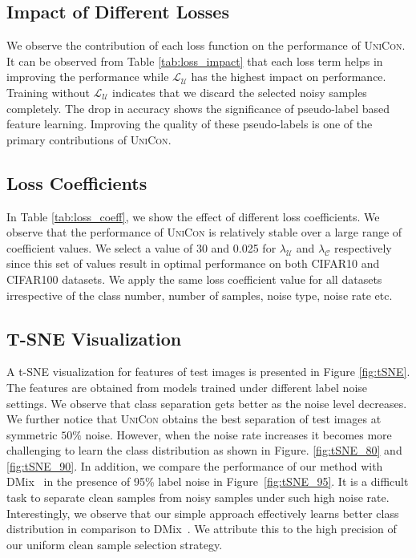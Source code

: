 \documentclass[10pt,twocolumn,letterpaper]{article}
\begin{document}
\subsection{Impact of Different Losses}
We observe the contribution of each loss function on the performance of \textsc{UniCon}. It can be observed from Table \ref{tab:loss_impact} that each loss term helps in improving the performance while $\mathcal{L}_\mathcal{U}$ has the highest impact on performance. Training without $\mathcal{L}_\mathcal{U}$ indicates that we discard the selected noisy samples completely. The drop in accuracy shows the significance of pseudo-label based feature learning. Improving the quality of these pseudo-labels is one of the primary contributions of \textsc{UniCon}.    



\subsection{Loss Coefficients}
In Table \ref{tab:loss_coeff}, we show the effect of different loss coefficients. We observe that the performance of \textsc{UniCon} is relatively stable over a large range of coefficient values. We select a value of 30 and 0.025 for $\lambda_\mathcal{U}$ and $\lambda_\mathcal{C}$ respectively since this set of values result in optimal performance on both CIFAR10 and CIFAR100 datasets. We apply the same loss coefficient value for all datasets irrespective of the class number, number of samples, noise type, noise rate etc.    



\subsection{T-SNE Visualization}
A t-SNE visualization\cite{van2008visualizing} for features of test images is presented in Figure \ref{fig:tSNE}. The features are obtained from models trained under different label noise settings. We observe that class separation gets better as the noise level decreases. We further notice that \textsc{UniCon} obtains the best separation of test images at symmetric $50\%$ noise. However, when the noise rate increases it becomes more challenging to learn the class distribution as shown in Figure. \ref{fig:tSNE_80} and \ref{fig:tSNE_90}. In addition, we compare the performance of our method with DMix~\cite{li2020dividemix} in the presence of 95\% label noise in Figure~\ref{fig:tSNE_95}. It is a difficult task to separate clean samples from noisy samples under such high noise rate. Interestingly, we observe that our simple approach effectively learns better class distribution in comparison to DMix~\cite{li2020dividemix}. We attribute this to the high precision of our uniform clean sample selection strategy.  
\end{document}
